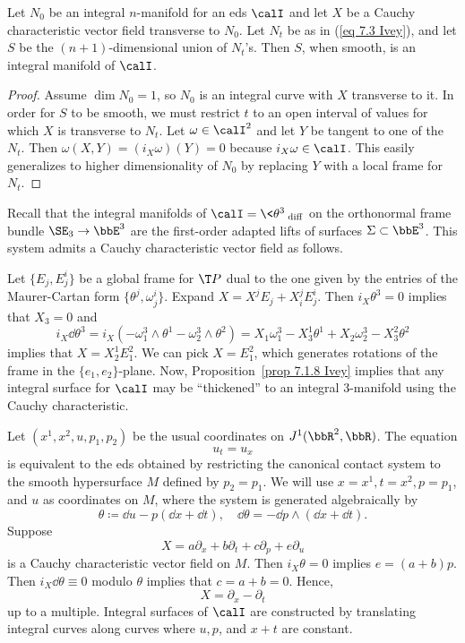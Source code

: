 \begin{prop}\label{prop 7.1.8 Ivey}
    Let $N_0$ be an integral $n$-manifold for an \gls{eds} $\calI$ and let $X$ be a Cauchy characteristic vector field transverse to $N_0$. Let $N_t$ be as in (\ref{eq 7.3 Ivey}), and let $S$ be the $(n+1)$-dimensional union of $N_t$'s. Then $S$, when smooth, is an integral manifold of $\calI$.
\end{prop}
\begin{proof}
    Assume $\dim N_0=1$, so $N_0$ is an integral curve with $X$ transverse to it. In order for $S$ to be smooth, we must restrict $t$ to an open interval of values for which $X$ is transverse to $N_t$. Let $\omega\in\calI^2$ and let $Y$ be tangent to one of the $N_t$. Then $\omega(X,Y)=(i_X\omega)(Y)=0$ because $i_X\omega\in\calI$.  This easily generalizes to higher dimensionality of $N_0$ by replacing $Y$ with a local frame for $N_t$.
\end{proof}

\begin{example}\label{ex 7.1.10 Ivey}
    Recall that the integral manifolds of $\calI=\<\theta^3\>_{\mathrm{diff}}$ on the orthonormal frame bundle $\SE_3\to \bbE^3$   are the first-order adapted lifts of surfaces $\Sigma\subset\bbE^3$. This system admits a Cauchy characteristic vector field as follows.

    Let $\{E_j,E^i_j\}$ be a global frame for $\T P$ dual to the one given by the entries of the Maurer-Cartan form $\{\theta^j,\omega^i_j\}$. Expand $X=X^jE_j+X^j_i E^i_j$. Then $i_X\theta^3=0$ implies that $X_3=0$ and 
    \[i_X \dd\theta^3=i_X(-\omega^3_1\wedge\theta^1-\omega^3_2\wedge\theta^2)=X_1\omega^3_1-X^1_3\theta^1+X_2\omega^3_2-X^2_3\theta^2\]
    implies that $X=X^1_2 E^2_1$. We can pick $X=E^2_1$, which generates rotations of the frame in the $\{e_1,e_2\}$-plane. Now, Proposition~\ref{prop 7.1.8 Ivey} implies that any integral surface for $\calI$ may be ``thickened'' to an integral $3$-manifold using the Cauchy characteristic.
\end{example}


\begin{example}
    Let $(x^1,x^2,u,p_1,p_2)$ be the usual coordinates on $J^1(\bbR^2,\bbR)$. The equation 
    \[u_t=u_x\] 
    is equivalent to the \gls{eds} obtained by restricting the canonical contact system to the smooth hypersurface $M$ defined by $p_2=p_1$. We will use $x=x^1,t=x^2,p=p_1$, and $u$ as coordinates on $M$, where the system is generated algebraically by 
    \[\theta\coloneqq \dd u-p(\dd x+\dd t),\quad \dd\theta=-\dd p\wedge(\dd x+\dd t).\]
    Suppose 
    \[X=a\partial_x+b\partial_t+c\partial_p+e\partial_u\]
    is a Cauchy characteristic vector field on $M$. Then $i_X\theta=0$ implies $e=(a+b)p$. Then $i_X\dd \theta\equiv 0$ modulo $\theta$ implies that $c=a+b=0$. Hence,
    \[X=\partial_x-\partial_t\]
    up to a multiple. Integral surfaces of $\calI$ are constructed by translating integral curves along curves where $u,p$, and $x+t$ are constant.
\end{example}

